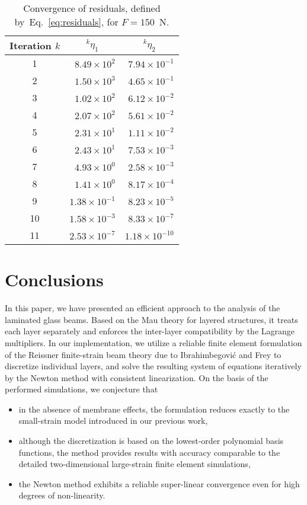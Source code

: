 \documentclass[11pt]{article}
\newcommand{\rev}[1]{#1}
\newcommand{\Eref}[1]{Eq.~\eqref{#1}}
\newcommand{\ite}[1]{{^{#1}}}
\begin{document}
\begin{table}[h]
\caption{Convergence of residuals, \rev{defined by~\Eref{eq:residuals}}, for
$F = 150$~N.}
\label{tab:convergence_progress}
\centering
\begin{tabular}{crr}
\hline 
Iteration $k$ & 
\multicolumn{1}{c}{$\ite{k}\eta_1$} & 
\multicolumn{1}{c}{$\ite{k}\eta_2$} \\
\hline 
 1 & $8.49\times 10^2$ & $7.94\times 10^{-1}$ \\
 2 & $1.50\times 10^3$ & $4.65\times 10^{-1}$ \\
 3 & $1.02\times 10^2$ & $6.12\times 10^{-2}$ \\
 4 & $2.07\times 10^2$ & $5.61\times 10^{-2}$ \\
 5 & $2.31\times 10^1$ & $1.11\times 10^{-2}$ \\
 6 & $2.43\times 10^1$ & $7.53\times 10^{-3}$ \\
 7 & $4.93\times 10^0$ & $2.58\times 10^{-3}$ \\
 8 & $1.41\times 10^0$ & $8.17\times 10^{-4}$ \\
 9 & $1.38\times 10^{-1}$ & $8.23\times 10^{-5}$ \\
10 & $1.58\times 10^{-3}$ & $8.33\times 10^{-7}$ \\
11 & $2.53\times 10^{-7}$ & $1.18\times 10^{-10}$ \\
\hline
\end{tabular}
\end{table}



\section{Conclusions}\label{sec:conclusions}
In this paper, we have presented an efficient approach to the analysis of the
laminated glass beams. Based on the Mau theory for layered structures, it treats
each layer separately and enforces the inter-layer compatibility by the Lagrange
multipliers. In our implementation, we utilize a reliable finite element
formulation of the Reissner finite-strain beam theory due to Ibrahimbegovi\'{c}
and Frey to discretize individual layers, and solve the resulting system of
equations iteratively by the Newton method with consistent linearization. On the
basis of the performed simulations, we conjecture that

\begin{itemize}
  \item in the absence of membrane effects, the formulation reduces exactly to
  the small-strain model introduced in our previous work, 
  \item although the discretization is based on the lowest-order polynomial
  basis functions, the method provides results with accuracy comparable to
  the detailed two-dimensional large-strain finite element simulations, 
  \item the Newton method exhibits a reliable super-linear convergence even for
  high degrees of non-linearity. 
\end{itemize}
\end{document}
